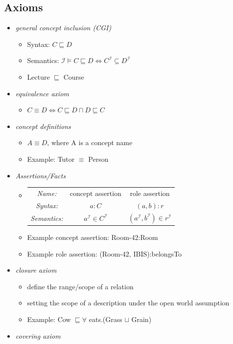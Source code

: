 \documentclass[12pt,a4paper]{article}
\newcommand{\ip}{^\mathcal{I}}
\newcommand{\sse}{\sqsubseteq}
\newcommand{\sand}{\sqcap}
\newcommand{\sor}{\sqcup}
\begin{document}
\subsection{Axioms}
\begin{itemize}
\item \textit{general concept inclusion (CGI)}
\begin{itemize}
\item Syntax: $C\sse D$
\item Semantics: $\mathcal{I} \models C \sse D \Leftrightarrow C\ip \subseteq D\ip$
\item Lecture $\sse$ Course
\end{itemize}
\item \textit{equivalence axiom}
\begin{itemize}
\item $C\equiv D \Leftrightarrow C \sse D \sand D \sse C$
\end{itemize}
\item \textit{concept definitions}
\begin{itemize}
\item $A \equiv D$, where A is a concept name
\item Example: Tutor $\equiv$ Person
\end{itemize}
\item \textit{Assertions/Facts}
\begin{itemize}
\item \begin{tabular}{c c c}
\textit{Name:} & concept assertion & role assertion\\
\textit{Syntax:} & $a:C$ & $(a,b):r$\\
\textit{Semantics:} & $a\ip \in C\ip$ & $(a\ip,b\ip)\in r\ip$
\end{tabular}
\item Example concept assertion: Room-42:Room
\item Example role assertion: (Room-42, IBIS):belongsTo
\end{itemize}
\item \textit{closure axiom}\begin{itemize}
\item define the range/scope of a relation
\item setting the scope of a description under the open world assumption
\item Example: Cow $\sse\forall$ eats.(Grass $\sor$ Grain)
\end{itemize}
\item \textit{covering axiom}

\end{itemize}
\end{document}
